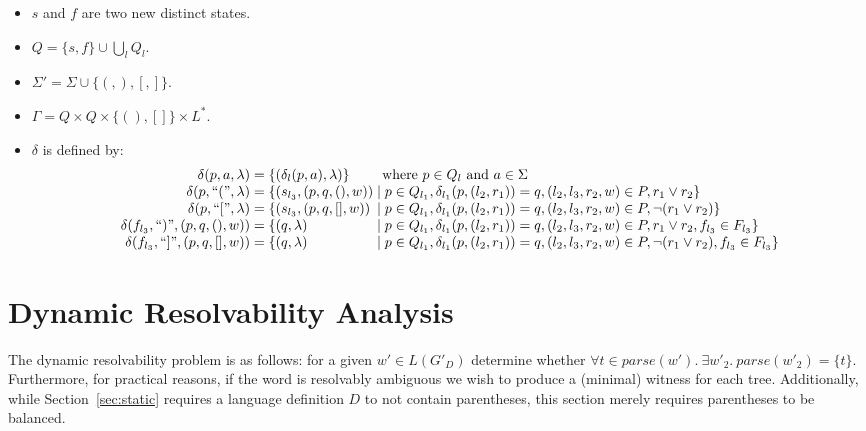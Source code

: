 \documentclass[acmsmall,review,anonymous]{acmart}\settopmatter{printfolios=true,printccs=false,printacmref=false}
\newcommand{\T}{\Sigma} %
\newcommand{\Labels}{L} %
\newcommand{\parse}{\mathit{parse}} %
\newcommand{\reqpl}{(}
\newcommand{\reqpr}{)}
\newcommand{\reqp}[1]{\reqpl#1\reqpr}
\newcommand{\pospl}{[}
\newcommand{\pospr}{]}
\newcommand{\posp}[1]{\pospl#1\pospr}
\begin{document}
\begin{itemize}
\item $s$ and $f$ are two new distinct states.
\item $Q = \{s, f\} \cup \bigcup_l Q_l$.
\item $\T' = \T \cup \{\reqpl, \reqpr, \pospl, \pospr\}$.
\item $\Gamma = Q \times Q \times \{\reqp{}, \posp{}\} \times \Labels^{*}$.
\item $\delta$ is defined by:
  $$
  \begin{array}{r@{\;=\;}l@{\;\mid\;}l}
    \delta(p, a, \lambda)
    & \multicolumn{2}{@{}l@{}}{\{(\delta_l(p, a), \lambda)\} \qquad \text{ where } p \in Q_l \text{ and } a \in \T} \\

    \delta(p, \text{``}\reqpl\text{''}, \lambda)
    & \{ (s_{l_3}, (p, q, \reqp{}, w))
    & p \in Q_{l_1}, \delta_{l_1}(p, (l_2, r_1)) = q, (l_2, l_3, r_2, w) \in P, r_1 \lor r_2 \} \\

    \delta(p, \text{``}\pospl\text{''}, \lambda)
    & \{ (s_{l_3}, (p, q, \posp{}, w))
    & p \in Q_{l_1}, \delta_{l_1}(p, (l_2, r_1)) = q, (l_2, l_3, r_2, w) \in P, \neg (r_1 \lor r_2) \} \\

    \delta(f_{l_3}, \text{``}\reqpr\text{''}, (p, q, \reqp{}, w))
    & \{ (q, \lambda)
    & p \in Q_{l_1}, \delta_{l_1}(p, (l_2, r_1)) = q, (l_2, l_3, r_2, w) \in P, r_1 \lor r_2, f_{l_3} \in F_{l_3} \} \\

    \delta(f_{l_3}, \text{``}\pospr\text{''}, (p, q, \posp{}, w))
    & \{ (q, \lambda)
    & p \in Q_{l_1}, \delta_{l_1}(p, (l_2, r_1)) = q, (l_2, l_3, r_2, w) \in P, \neg (r_1 \lor r_2), f_{l_3} \in F_{l_3} \} \\
  \end{array}
  $$
\end{itemize}


\section{Dynamic Resolvability Analysis} \label{sec:dynamic}

The dynamic resolvability problem is as follows: for a given $w' \in L(G'_D)$ determine whether $\forall t \in \parse(w').\ \exists w'_2.\ \parse(w'_2) = \{t\}$. Furthermore, for practical reasons, if the word is resolvably ambiguous we wish to produce a (minimal) witness for each tree. Additionally, while Section~\ref{sec:static} requires a language definition $D$ to not contain parentheses, this section merely requires parentheses to be balanced.
\end{document}

